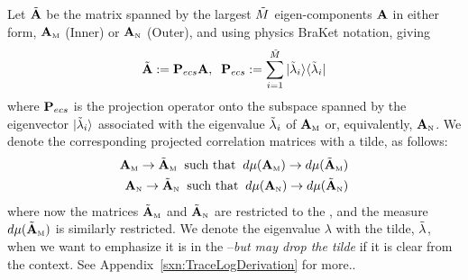 Let $\tilde{\mathbf{A}}$ be the matrix spanned by the largest $\tilde{M}$ eigen-components $\mathbf{A}$
in either form, ${\mathbf{A}}_{\text{\tiny M}}$ (Inner) or ${\mathbf{A}}_{\text{\tiny N}}$ (Outer), and using physics BraKet notation, giving
\begin{align}
  \label{sqn:AecsDefined}
  \tilde{\mathbf{A}}:=\mathbf{P}_{ecs}\mathbf{A},\;\;  \mathbf{P}_{ecs}:= \sum_{i=1}^{\tilde{M}}|\tilde{\lambda}_{i}\rangle\langle\tilde{\lambda}_{i}|
\end{align}
where $\mathbf{P}_{ecs}$ is the projection operator onto the subspace spanned by the eigenvector
$|\tilde{\lambda}_{i}\rangle$  associated with the eigenvalue $\tilde{\lambda}_{i}$ of ${\mathbf{A}}_{\text{\tiny M}}$ or, equivalently, ${\mathbf{A}}_{\text{\tiny N}}$.
We denote the corresponding projected \Student correlation matrices with a tilde, as follows:
\begin{align}
  {\mathbf{A}}_{\text{\tiny M}} \rightarrow \tilde{\mathbf{A}}_{\text{\tiny M}}\;\; \text{such that}\;\; d\mu({\mathbf{A}}_{\text{\tiny M}}) \rightarrow d\mu(\tilde{\mathbf{A}}_{\text{\tiny M}}) \\ \nonumber
  {\mathbf{A}}_{\text{\tiny N}} \rightarrow \tilde{\mathbf{A}}_{\text{\tiny N}}\;\; \text{such that}\;\; d\mu({\mathbf{A}}_{\text{\tiny N}}) \rightarrow d\mu(\tilde{\mathbf{A}}_{\text{\tiny N}})  \nonumber
\end{align}
where now the matrices $\tilde{\mathbf{A}}_{\text{\tiny M}}$ and $\tilde{\mathbf{A}}_{\text{\tiny N}}$ are restricted to the \ECS, and the measure $d\mu(\tilde{\mathbf{A}}_{\text{\tiny M}})$ is similarly restricted.  We denote the eigenvalue $\lambda$ with the tilde, $\tilde{\lambda}$, when we want to emphasize it is in the \ECS--\emph{but may drop the tilde} if it is clear from the context.
 See Appendix~\ref{sxn:TraceLogDerivation} for more..
   
